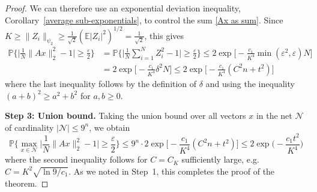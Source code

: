 \documentclass[10pt, openany]{book}
\theoremstyle{remark}
\def \E {\mathbb{E}}
\def \P {\mathbb{P}}
\def \NN {\mathcal{N}}
\def \e {\varepsilon}
\def \d {\delta}
\def \psitwo {{\psi_2}}
\begin{document}
\begin{proof}
We can therefore use an exponential deviation inequality, Corollary~\ref{average sub-exponentials}, 
to control the sum \eqref{Ax as sum}. Since 
$K \ge \|Z_i\|_\psitwo \ge \frac{1}{\sqrt{2}} (\E|Z_i|^2)^{1/2} = \frac{1}{\sqrt{2}}$, this gives 
\begin{align*}
\P \Big\{ \big| \frac{1}{N} \|Ax\|_2^2 - 1 \big| \ge \frac{\e}{2} \Big\}
  &= \P \Big\{ \big| \frac{1}{N}\sum_{i=1}^N Z_i^2 - 1 \big| \ge \frac{\e}{2} \Big\} 
  \le 2 \exp \Big[ - \frac{c_1}{K^4} \min(\e^2, \e) N \Big] \\
  &= 2 \exp \Big[ - \frac{c_1}{K^4} \d^2 N \Big]
  \le 2 \exp \Big[ - \frac{c_1}{K^4} (C^2 n + t^2) \Big]
\end{align*}
where the last inequality follows by the definition of $\d$ 
and using the inequality $(a+b)^2 \ge a^2 + b^2$ for $a,b \ge 0$.


{\bf Step 3: Union bound.}
Taking the union bound over all vectors $x$ in the net $\NN$ of cardinality $|\NN| \le 9^n$,
we obtain 
$$
\P \Big\{ \max_{x \in \NN} \big| \frac{1}{N} \|Ax\|_2^2 - 1 \big| \ge \frac{\e}{2} \Big\}
\le 9^n \cdot 2 \exp \Big[ - \frac{c_1}{K^4} (C^2 n + t^2) \Big]
\le 2 \exp \Big( - \frac{c_1 t^2}{K^4} \Big)
$$
where the second inequality follows for $C = C_K$ sufficiently large, 
e.g. $C = K^2 \sqrt{\ln 9/c_1}$.
As we noted in Step~1, this completes the proof of the theorem.
\end{proof}
\end{document}
